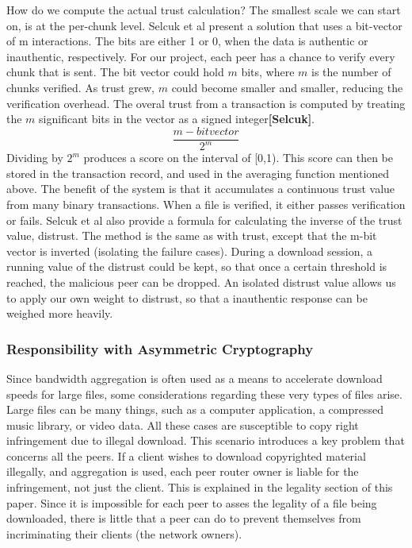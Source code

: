 \documentclass[12pt]{article}
\newcommand{\lcite}[1]
{{\bfseries\color{orange}[#1]}}
\begin{document}
			How do we compute the actual trust calculation? The smallest scale we can start on, is at the per-chunk level. Selcuk et al present a solution that uses a bit-vector of m interactions. The bits are either 1 or 0, when the data is authentic or inauthentic, respectively. For our project, each peer has a chance to verify every chunk that is sent. The bit vector could hold $m$ bits, where $m$ is the number of chunks verified. As trust grew, $m$ could become smaller and smaller, reducing the verification overhead. The overal trust from a transaction is computed by treating the $m$ significant bits in the vector as a signed integer\lcite{Selcuk}.
				$$
						\frac{m-bit vector}{2^m}
				$$
			Dividing by $2^m$ produces a score on the interval of [0,1). This score can then be stored in the transaction record, and used in the averaging function mentioned above. The benefit of the system is that it accumulates a continuous trust value from many binary transactions. When a file is verified, it either passes verification or fails. Selcuk et al also provide a formula for calculating the inverse of the trust value, distrust. The method is the same as with trust, except that the m-bit vector is inverted (isolating the failure cases). During a download session, a running value of the distrust could be kept, so that once a certain threshold is reached, the malicious peer can be dropped. An isolated distrust value allows us to apply our own weight to distrust, so that a inauthentic response can be weighed more heavily. 




		\subsubsection{Responsibility with Asymmetric Cryptography}

			Since bandwidth aggregation is often used as a means to accelerate download speeds for large files, some considerations regarding these very types of files arise. Large files can be many things, such as a computer application, a compressed music library, or video data. All these cases are susceptible to copy right infringement due to illegal download. This scenario introduces a key problem that concerns all the peers. If a client wishes to download copyrighted material illegally, and aggregation is used, each peer router owner is liable for the infringement, not just the client. This is explained in the legality section of this paper. Since it is impossible for each peer to asses the legality of a file being downloaded, there is little that a peer can do to prevent themselves from incriminating their clients (the network owners). \\
\end{document}
